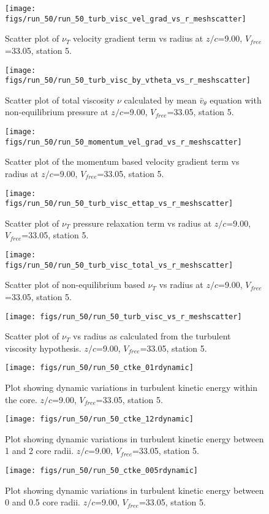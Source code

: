 \begin{figure}[H]
\centering
\texttt{[image: figs/run\_50/run\_50\_turb\_visc\_vel\_grad\_vs\_r\_meshscatter]}
\caption{Scatter plot of $\nu_T$ velocity gradient term vs radius at $z/c$=9.00, $V_{free}$=33.05, station 5.}
\end{figure}


\begin{figure}[H]
\centering
\texttt{[image: figs/run\_50/run\_50\_turb\_visc\_by\_vtheta\_vs\_r\_meshscatter]}
\caption{Scatter plot of total viscosity $\nu$ calculated by mean $\bar{v}_{\theta}$ equation with non-equilibrium pressure at $z/c$=9.00, $V_{free}$=33.05, station 5.}
\end{figure}


\begin{figure}[H]
\centering
\texttt{[image: figs/run\_50/run\_50\_momentum\_vel\_grad\_vs\_r\_meshscatter]}
\caption{Scatter plot of the momentum based velocity gradient term vs radius at $z/c$=9.00, $V_{free}$=33.05, station 5.}
\end{figure}


\begin{figure}[H]
\centering
\texttt{[image: figs/run\_50/run\_50\_turb\_visc\_ettap\_vs\_r\_meshscatter]}
\caption{Scatter plot of $\nu_T$ pressure relaxation term vs radius at $z/c$=9.00, $V_{free}$=33.05, station 5.}
\end{figure}


\begin{figure}[H]
\centering
\texttt{[image: figs/run\_50/run\_50\_turb\_visc\_total\_vs\_r\_meshscatter]}
\caption{Scatter plot of non-equilibrium based $\nu_T$ vs radius at $z/c$=9.00, $V_{free}$=33.05, station 5.}
\end{figure}


\begin{figure}[H]
\centering
\texttt{[image: figs/run\_50/run\_50\_turb\_visc\_vs\_r\_meshscatter]}
\caption{Scatter plot of $\nu_T$ vs radius as calculated from the turbulent viscosity hypothesis. $z/c$=9.00, $V_{free}$=33.05, station 5.}
\end{figure}


\begin{figure}[H]
\centering
\texttt{[image: figs/run\_50/run\_50\_ctke\_01rdynamic]}
\caption{Plot showing dynamic variations in turbulent kinetic energy within the core. $z/c$=9.00, $V_{free}$=33.05, station 5.}
\end{figure}


\begin{figure}[H]
\centering
\texttt{[image: figs/run\_50/run\_50\_ctke\_12rdynamic]}
\caption{Plot showing dynamic variations in turbulent kinetic energy between 1 and 2 core radii. $z/c$=9.00, $V_{free}$=33.05, station 5.}
\end{figure}


\begin{figure}[H]
\centering
\texttt{[image: figs/run\_50/run\_50\_ctke\_005rdynamic]}
\caption{Plot showing dynamic variations in turbulent kinetic energy between 0 and 0.5 core radii. $z/c$=9.00, $V_{free}$=33.05, station 5.}
\end{figure}


